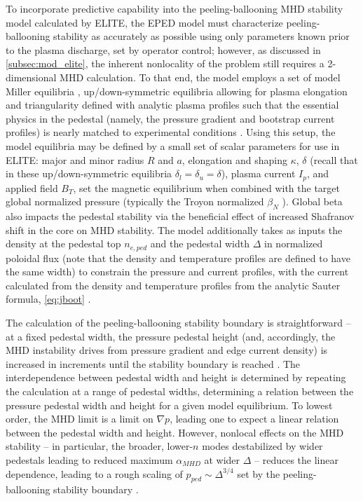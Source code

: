To incorporate predictive capability into the peeling-ballooning MHD stability model calculated by ELITE, the EPED model must characterize peeling-ballooning stability as accurately as possible using only parameters known prior to the plasma discharge, set by operator control; however, as discussed in \cref{subsec:mod_elite}, the inherent nonlocality of the problem still requires a 2-dimensional MHD calculation.  To that end, the model employs a set of model Miller equilibria \cite{Miller1998}, up/down-symmetric equilibria allowing for plasma elongation and triangularity defined with analytic plasma profiles such that the essential physics in the pedestal (namely, the pressure gradient and bootstrap current profiles) is nearly matched to experimental conditions \cite{Snyder2009}.  Using this setup, the model equilibria may be defined by a small set of scalar parameters for use in ELITE: major and minor radius $R$ and $a$, elongation and shaping $\kappa$, $\delta$ (recall that in these up/down-symmetric equilibria $\delta_l = \delta_u = \delta$), plasma current $I_p$, and applied field $B_T$, set the magnetic equilibrium when combined with the target global normalized pressure (typically the Troyon normalized $\beta_N$ \cite{Troyon1984}).  Global beta also impacts the pedestal stability via the beneficial effect of increased Shafranov shift in the core on MHD stability.  The model additionally takes as inputs the density at the pedestal top $n_{e,ped}$ and the pedestal width $\Delta$ in normalized poloidal flux (note that the density and temperature profiles are defined to have the same width) to constrain the pressure and current profiles, with the current calculated from the density and temperature profiles from the analytic Sauter formula, \cref{eq:jboot} \cite{Sauter1999}.

The calculation of the peeling-ballooning stability boundary is straightforward -- at a fixed pedestal width, the pressure pedestal height (and, accordingly, the MHD instability drives from pressure gradient and edge current density) is increased in increments until the stability boundary is reached \cite{Snyder2009}.  The interdependence between pedestal width and height is determined by repeating the calculation at a range of pedestal widths, determining a relation between the pressure pedestal width and height for a given model equilibrium.  To lowest order, the MHD limit is a limit on $\nabla p$, leading one to expect a linear relation between the pedestal width and height.  However, nonlocal effects on the MHD stability -- in particular, the broader, lower-$n$ modes destabilized by wider pedestals leading to reduced maximum $\alpha_{MHD}$ at wider $\Delta$ -- reduces the linear dependence, leading to a rough scaling of $p_{ped} \sim \Delta^{3/4}$ set by the peeling-ballooning stability boundary \cite{Snyder2009a}.

